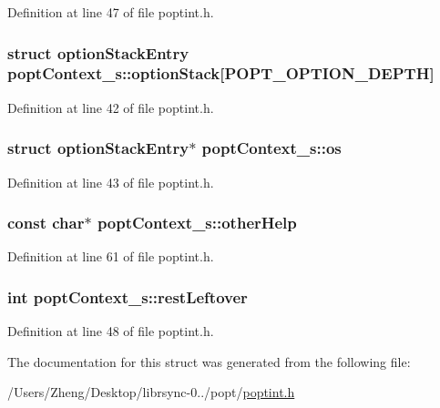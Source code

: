 Definition at line 47 of file poptint.\+h.

\hypertarget{structpopt_context__s_afb4fe00e407510f15c15de9bcdcc9a03}{}
\subsubsection[{option\+Stack}]{\setlength{\rightskip}{0pt plus 5cm}struct {\bf option\+Stack\+Entry} popt\+Context\+\_\+s\+::option\+Stack\mbox{[}{\bf P\+O\+P\+T\+\_\+\+O\+P\+T\+I\+O\+N\+\_\+\+D\+E\+P\+T\+H}\mbox{]}}\label{structpopt_context__s_afb4fe00e407510f15c15de9bcdcc9a03}


Definition at line 42 of file poptint.\+h.

\hypertarget{structpopt_context__s_a5cdc6e58403772122b3cfe4a0dcae0d2}{}
\subsubsection[{os}]{\setlength{\rightskip}{0pt plus 5cm}struct {\bf option\+Stack\+Entry}$\ast$ popt\+Context\+\_\+s\+::os}\label{structpopt_context__s_a5cdc6e58403772122b3cfe4a0dcae0d2}


Definition at line 43 of file poptint.\+h.

\hypertarget{structpopt_context__s_a6ea7478c290af28b37f850b2a3c75c19}{}
\subsubsection[{other\+Help}]{\setlength{\rightskip}{0pt plus 5cm}const char$\ast$ popt\+Context\+\_\+s\+::other\+Help}\label{structpopt_context__s_a6ea7478c290af28b37f850b2a3c75c19}


Definition at line 61 of file poptint.\+h.

\hypertarget{structpopt_context__s_abe76dfc76f4a31852dafd07ae0361537}{}
\subsubsection[{rest\+Leftover}]{\setlength{\rightskip}{0pt plus 5cm}int popt\+Context\+\_\+s\+::rest\+Leftover}\label{structpopt_context__s_abe76dfc76f4a31852dafd07ae0361537}


Definition at line 48 of file poptint.\+h.



The documentation for this struct was generated from the following file\+:\begin{DoxyCompactItemize}
\item 
/\+Users/\+Zheng/\+Desktop/librsync-\/0../popt/\hyperlink{poptint_8h}{poptint.\+h}\end{DoxyCompactItemize}

